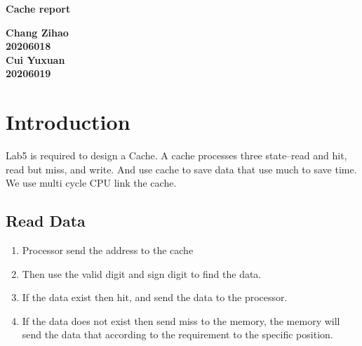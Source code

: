 \documentclass[12pt,a4paper]{article}
\begin{document}
\begin{titlepage}
  \begin{center}
    \vspace*{1cm}

    \textbf{\Huge Cache report}

    \vspace{0.5cm}

         
    \vspace{1.5cm}

    \textbf{\large Chang Zihao \\20206018\\\large Cui Yuxuan\\20206019}

    \vfill
         

         
    \vspace{0.8cm}
  


         
\end{center}
\end{titlepage}


\newpage
\tableofcontents
\thispagestyle{empty}

\newpage
{}
\setcounter{page}{1}

\section{Introduction}

Lab5 is required to design a Cache.
A cache processes three state--read and hit, read but miss, and write.
And use cache to save data that use much to save time.
We use multi cycle CPU link the cache.

\subsection{Read Data}

\begin{enumerate}
\item Processor send the address to the cache
\item Then use the valid digit and sign digit to find the data.
\item If the data exist then hit, and send the data to the processor.
\item If the data does not exist then send miss to the memory, the memory will send the data that according to the requirement to the specific position.

\end{enumerate}
\end{document}
